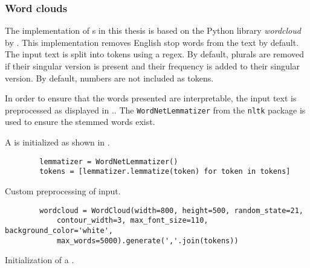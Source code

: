 \subsubsection*{Word clouds}\label{subsubsec:impl-wordcloud}

The implementation of \wordcloud{}s in this thesis is based on the Python library \textit{wordcloud} by \citeauthor{wordcloud-dev} \cite{wordcloud-dev}.
This implementation removes English stop words from the text by default.
The input text is split into tokens using a regex.
By default, plurals are removed if their singular version is present and their frequency is added to their singular version.
By default, numbers are not included as tokens.

In order to ensure that the words presented are interpretable, the input text is preprocessed as displayed in ..
The \texttt{WordNetLemmatizer} from the \texttt{nltk} package is used to ensure the stemmed words exist.

A \wordcloud{} is initialized as shown in .

\begin{listing}[htp]
    \begin{verbatim}
        lemmatizer = WordNetLemmatizer()
        tokens = [lemmatizer.lemmatize(token) for token in tokens]
    \end{verbatim}
    \caption[Custom preprocessing of \wordcloud{} input]
    {Custom preprocessing of \wordcloud{} input.
    }
    \label{lst:impl-preproc-wordcloud}
\end{listing}

\begin{listing}[htp]
    \begin{verbatim}
        wordcloud = WordCloud(width=800, height=500, random_state=21, 
            contour_width=3, max_font_size=110, background_color='white', 
            max_words=5000).generate(','.join(tokens))
    \end{verbatim}
    \caption[Initialization of a \wordcloud{}]
    {Initialization of a \wordcloud{}.
    }
    \label{lst:impl-wordcloud}
\end{listing}

